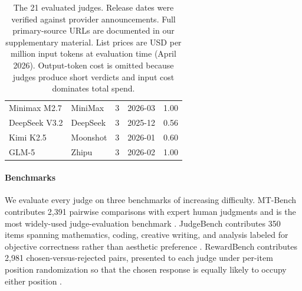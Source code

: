 \documentclass[11pt]{article}
\begin{document}
\begin{table}[t]
{\begin{tabular}{llccc}
Minimax M2.7      & MiniMax   & 3 & 2026-03 & 1.00  \\
DeepSeek V3.2     & DeepSeek  & 3 & 2025-12 & 0.56  \\
Kimi K2.5         & Moonshot  & 3 & 2026-01 & 0.60  \\
GLM-5             & Zhipu     & 3 & 2026-02 & 1.00  \\
\bottomrule
\end{tabular}}
\caption{\footnotesize The 21 evaluated judges. Release dates were verified against provider
announcements. Full primary-source URLs are documented in our supplementary
material. List prices are USD per million input tokens at evaluation time (April 2026).
Output-token cost is omitted because judges produce short verdicts and input cost dominates total spend.}
\label{tab:models}
\end{table}

\paragraph{Benchmarks}


We evaluate every judge on three benchmarks of increasing difficulty. MT-Bench  contributes 2,391 pairwise comparisons with expert human judgments and is the most widely-used judge-evaluation benchmark \citep{zheng2023judging}. JudgeBench contributes 350 items spanning mathematics, coding, creative writing, and analysis labeled for objective correctness rather than aesthetic preference \citep{tan2025judgebench}. RewardBench  contributes 2,981 chosen-versus-rejected pairs, presented to each judge under per-item position randomization so that the chosen response is equally likely to occupy either position \citep{lambert2024rewardbench}. 
\end{document}
